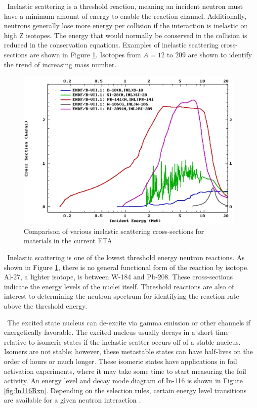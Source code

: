 \ Inelastic scattering is a threshold reaction, meaning an incident neutron must have a minimum amount of energy to enable the reaction channel. 
Additionally, neutrons generally lose more energy per collision if the interaction is inelastic on high Z isotopes. 
The energy that would normally be conserved in the collision is reduced in the conservation equations. 
Examples of inelastic scattering cross-sections are shown in Figure \ref{fig:inelastic}. Isotopes from $A=12$ to $209$ are shown to identify the trend of increasing mass number. 

\begin{figure}[ht]
	\includegraphics[width=\linewidth]{Figures/Chapter2/inelastic.png}
	\caption[Comparison of various inelastic scattering cross-sections for materials in the current ETA]{Comparison of various inelastic scattering cross-sections for materials in the current ETA\cite{ENDF}}
	\label{fig:inelastic}
\end{figure}

\ Inelastic scattering is one of the lowest threshold energy neutron reactions.
As shown in Figure \ref{fig:inelastic}, there is no general functional form of the reaction by isotope. 
Al-27, a lighter isotope, is between W-184 and Pb-208. 
These cross-sections indicate the energy levels of the nuclei itself. 
Threshold reactions are also of interest to determining the neutron spectrum for identifying the reaction rate above the threshold energy.

\ The excited state nucleus can de-excite via gamma emission or other channels if energetically favorable. 
The excited nucleus usually decays in a short time relative to isomeric states if the inelastic scatter occurs off of a stable nucleus. 
Isomers are not stable; however, these metastable states can have half-lives on the order of hours or much longer\cite{Krane}. 
These isomeric states have applications in foil activation experiments, where it may take some time to start measuring the foil activity. 
An energy level and decay mode diagram of In-116 is shown in Figure \ref{fig:In116Rxn}.
Depending on the selection rules, certain energy level transitions are available for a given neutron interaction \cite{Knoll}.  

